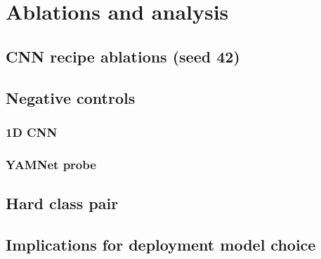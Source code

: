 \section{Ablations and analysis}
\label{sec:ablations}

\subsection{CNN recipe ablations (seed 42)}

\subsection{Negative controls}
\subsubsection{1D CNN}

\subsubsection{YAMNet probe}

\subsection{Hard class pair}

\subsection{Implications for deployment model choice}
